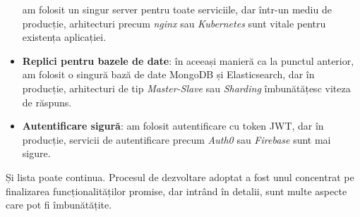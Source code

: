 \begin{itemize}
    am folosit un singur server pentru toate serviciile, dar într-un mediu de producție,
    arhitecturi precum \textit{nginx} sau \textit{Kubernetes} sunt vitale pentru existența aplicației.
    \item \textbf{Replici pentru bazele de date}: în aceeași manieră ca la punctul anterior, am folosit
    o singură bază de date MongoDB și Elasticsearch, dar în producție, arhitecturi de tip 
    \textit{Master-Slave} sau \textit{Sharding} îmbunătățesc viteza de răspuns.
    \item \textbf{Autentificare sigură}: am folosit autentificare cu token JWT, dar în producție,
    servicii de autentificare precum \textit{Auth0} sau \textit{Firebase} sunt mai sigure.
\end{itemize}

\par
Și lista poate continua. Procesul de dezvoltare adoptat a fost unul concentrat pe finalizarea
funcționalităților promise, dar intrând în detalii, sunt multe aspecte care pot fi îmbunătățite.

